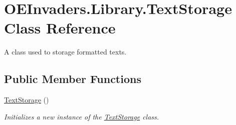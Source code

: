 \hypertarget{class_o_e_invaders_1_1_library_1_1_text_storage}{}\section{O\+E\+Invaders.\+Library.\+Text\+Storage Class Reference}
\label{class_o_e_invaders_1_1_library_1_1_text_storage}


A class used to storage formatted texts.  


\subsection*{Public Member Functions}
\begin{DoxyCompactItemize}
\item 
\mbox{\hyperlink{class_o_e_invaders_1_1_library_1_1_text_storage_a2718adaf0377ff8058f9ae49a3a8bff2}{Text\+Storage}} ()
\begin{DoxyCompactList}\small\item\em Initializes a new instance of the \mbox{\hyperlink{class_o_e_invaders_1_1_library_1_1_text_storage}{Text\+Storage}} class. \end{DoxyCompactList}\end{DoxyCompactItemize}
